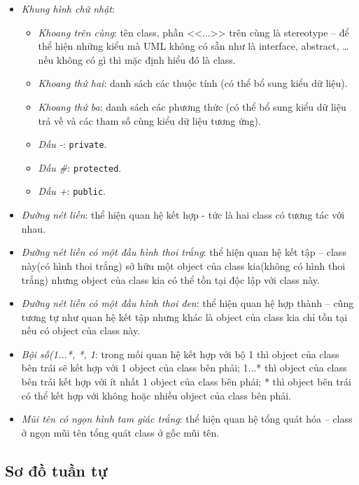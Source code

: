 \documentclass{article}
\begin{document}
  \begin{itemize}
    \item \textit{Khung hình chữ nhật}:
      \begin{itemize}
        \item \textit{Khoang trên cùng}: tên class, phần <<...>> trên cùng là stereotype -- để thể hiện những kiểu mà UML không có sẵn như là interface, abstract, \ldots nếu không có gì thì mặc định hiểu đó là class.
        \item \textit{Khoang thứ hai}: danh sách các thuộc tính (có thể bổ sung kiểu dữ liệu).
        \item \textit{Khoang thứ ba}: danh sách các phương thức (có thể bổ sung kiểu dữ liệu trả về và các tham số cùng kiểu dữ liệu tương ứng).
        \item \textit{Dấu -}: \texttt{private}.
        \item \textit{Dấu \#}: \texttt{protected}.
        \item \textit{Dấu +}: \texttt{public}.
      \end{itemize}
      \item \textit{Đường nét liền}: thể hiện quan hệ kết hợp - tức là hai class có tương tác với nhau.
      \item \textit{Đường nét liền có một đầu hình thoi trắng}: thể hiện quan hệ kết tập -- class này(có hình thoi trắng) sở hữu một object của class kia(không có hình thoi trắng) nhưng object của class kia có thể tồn tại độc lập với class này.
      \item \textit{Đường nét liền có một đầu hình thoi đen}: thể hiện quan hệ hợp thành -- cũng tương tự như quan hệ kết tập nhưng khác là object của class kia chỉ tồn tại nếu có object của class này.
      \item \textit{Bội số(1...*, *, 1}: trong mối quan hệ kết hợp với bộ 1 thì object của class bên trái sẽ kết hợp với 1 object của class bên phải; 1...* thì object của class bên trái kết hợp với ít nhất 1 object của class bên phải; * thì object bên trái có thể kết hợp với không hoặc nhiều object của class bên phải.
      \item  \textit{Mũi tên có ngọn hình tam giác trắng}: thể hiện quan hệ tổng quát hóa -- class ở ngọn mũi tên tổng quát class ở gốc mũi tên.
  \end{itemize}

  \subsection{Sơ đồ tuần tự}
\end{document}

